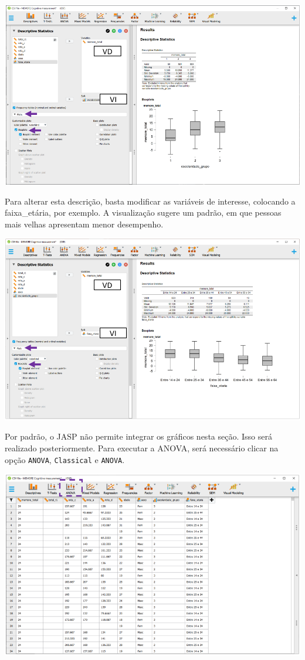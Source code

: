 \documentclass[
]{book}
\begin{document}
\includegraphics{./img/cap_anova_two_way_plot.png}

Para alterar esta descrição, basta modificar as variáveis de interesse, colocando a faixa\_etária, por exemplo. A visualização sugere um padrão, em que pessoas mais velhas apresentam menor desempenho.

\includegraphics{./img/cap_anova_two_way_plot1.png}

Por padrão, o JASP não permite integrar os gráficos nesta seção. Isso será realizado posteriormente. Para executar a ANOVA, será necessário clicar na opção \texttt{ANOVA}, \texttt{Classical} e \texttt{ANOVA}.

\includegraphics{./img/cap_anova_interface3.png}
\end{document}
